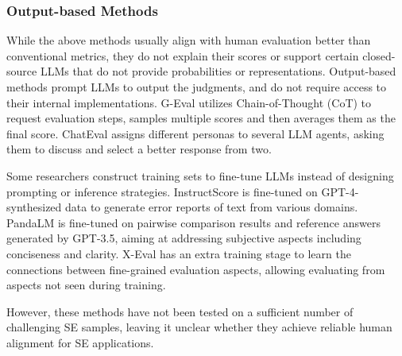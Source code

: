 \subsubsection{Output-based Methods} 
While the above methods usually align with human evaluation better than conventional metrics, they do not explain their scores or support certain closed-source LLMs that do not provide probabilities or representations. Output-based methods prompt LLMs to output the judgments, and do not require access to their internal implementations. G-Eval \cite{DBLP:conf/emnlp/LiuIXWXZ23} utilizes Chain-of-Thought (CoT) \cite{DBLP:conf/nips/Wei0SBIXCLZ22} to request evaluation steps, samples multiple scores and then averages them as the final score. ChatEval \cite{DBLP:conf/iclr/ChanCSYXZF024} assigns different personas to several LLM agents, asking them to discuss and select a better response from two. 

Some researchers construct training sets to fine-tune LLMs instead of designing prompting or inference strategies. InstructScore \cite{DBLP:conf/emnlp/XuWPSFWL23} is fine-tuned on GPT-4-synthesized data to generate error reports of text from various domains. PandaLM \cite{DBLP:conf/iclr/WangYYZYW0J000024} is fine-tuned on pairwise comparison results and reference answers generated by GPT-3.5, aiming at addressing subjective aspects including conciseness and clarity. X-Eval \cite{DBLP:conf/naacl/LiuSX0CKGH24} has an extra training stage to learn the connections between fine-grained evaluation aspects, allowing evaluating from aspects not seen during training.

However, these methods have not been tested on a sufficient number of challenging SE samples, leaving it unclear whether they achieve reliable human alignment for SE applications.